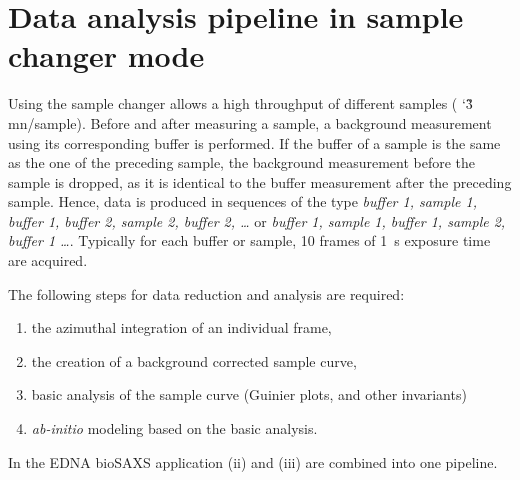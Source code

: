 \documentclass[preprint,pdf]{iucr}              %
\begin{document}
\section{Data analysis pipeline in sample changer mode}

Using the sample changer allows a high throughput of different samples (
\char`\~3 mn/sample).
Before and after measuring a sample, a background measurement using its
corresponding buffer is performed.
If the buffer of a sample is the same as the one of the preceding sample, the
background measurement before the sample is dropped, as it is identical to the
buffer measurement after the preceding sample.
Hence, data is produced in sequences of the type \textit{buffer 1, sample 1,
buffer 1, buffer 2, sample 2, buffer 2, \ldots}  or  \textit{buffer 1, sample 1,
buffer 1,  sample 2, buffer 1 \ldots}.
Typically for each buffer or sample, 10 frames of 1~s exposure time are acquired.

The following steps for data reduction and analysis are required:
\begin{enumerate}
\item the azimuthal integration of an individual frame,
\item the creation of a background corrected sample curve,
\item basic analysis of the sample curve (Guinier plots, and other invariants)
\item \textit{ab-initio} modeling based on the basic analysis.
\end{enumerate}
In the EDNA bioSAXS application (ii) and (iii) are combined into one pipeline.
\end{document}
